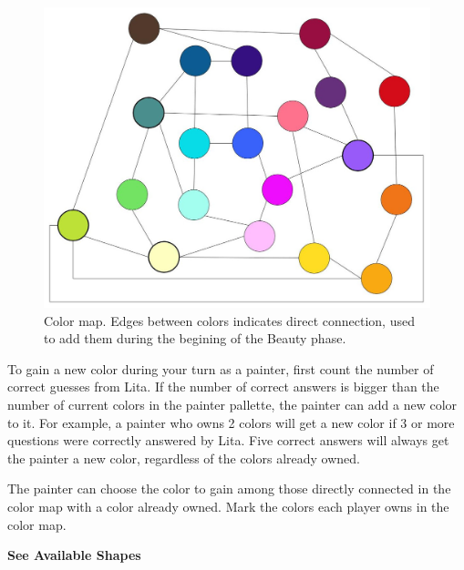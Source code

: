 \documentclass[twocolumn]{article}
\newcommand{\lvl}[1]{\vspace{0.5cm}\Large{\textbf{#1}}\vspace{0.2cm}}
\begin{document}
\begin{figure}[th!]
\centering
\includegraphics[scale=0.39]{color_map.jpg}
\caption{Color map. Edges between colors indicates direct connection, used to add them during the begining of the Beauty phase.}
\label{fig:color_map}
\end{figure}

To gain a new color during your turn as a painter, first count the number of correct guesses from Lita. If the number of correct answers is bigger than the number of current colors in the painter pallette, the painter can add a new color to it. For example, a painter who owns 2 colors will get a new color if 3 or more questions were correctly answered by Lita. Five correct answers will always get the painter a new color, regardless of the colors already owned.

The painter can choose the color to gain among those directly connected in the color map with a color already owned. Mark the colors each player owns in the color map.


\lvl{See Available Shapes}
\end{document}

